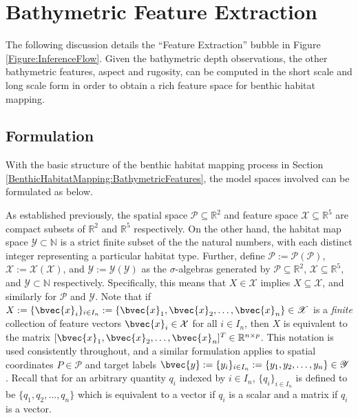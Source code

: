 \chapter{Bathymetric Feature Extraction}
\label{Appendix:BathymetricFeatureExtraction}

	The following discussion details the ``Feature Extraction'' bubble in Figure \ref{Figure:InferenceFlow}. Given the bathymetric depth observations, the other bathymetric features, aspect and rugosity, can be computed in the short scale and long scale form in order to obtain a rich feature space for benthic habitat mapping.
	
	\section{Formulation}
	\label{Appendix:BathymetricFeatureExtraction:Formulation}
	
		With the basic structure of the benthic habitat mapping process in Section \ref{BenthicHabitatMapping:BathymetricFeatures}, the model spaces involved can be formulated as below.
		
		As established previously, the spatial space $\mathcal{P} \subseteq \mathbb{R}^{2}$ and feature space $\mathcal{X} \subseteq \mathbb{R}^{5}$ are compact subsets of $\mathbb{R}^{2}$ and $\mathbb{R}^{5}$ respectively. On the other hand, the habitat map space $\mathcal{Y} \subset \mathbb{N}$ is a strict finite subset of the the natural numbers, with each distinct integer representing a particular habitat type. Further, define $\mathscr{P} := \mathscr{P}(\mathcal{P})$, $\mathscr{X} := \mathscr{X}(\mathcal{X})$, and $\mathscr{Y} := \mathscr{Y}(\mathcal{Y})$ as the $\sigma$-algebras generated by $\mathcal{P} \subseteq \mathbb{R}^{2}$, $\mathcal{X} \subseteq \mathbb{R}^{5}$, and $\mathcal{Y} \subset \mathbb{N}$ respectively. Specifically, this means that $X \in \mathscr{X}$ implies $X \subseteq \mathcal{X}$, and similarly for $\mathscr{P}$ and $\mathscr{Y}$. Note that if $X := \{\bvec{x}_{i}\}_{i \in I_{n}} := \{\bvec{x}_{1}, \bvec{x}_{2}, \dots, \bvec{x}_{n}\} \in \mathscr{X}$ is a \textit{finite} collection of feature vectors $\bvec{x}_{i} \in \mathcal{X}$ for all $i \in I_{n}$, then $X$ is equivalent to the matrix $[\bvec{x}_{1}, \bvec{x}_{2}, \dots, \bvec{x}_{n}]^{T} \in \mathbb{R}^{n \times p}$. This notation is used consistently throughout, and a similar formulation applies to spatial coordinates $P \in \mathscr{P}$ and target labels $\bvec{y} := \{y_{i}\}_{i \in I_{n}} := \{y_{1}, y_{2}, \dots, y_{n}\} \in \mathscr{Y}$. Recall that for an arbitrary quantity $q_{i}$ indexed by $i \in I_{n}$, $\{q_{i}\}_{i \in I_{n}}$ is defined to be $\{q_{1}, q_{2}, \dots, q_{n}\}$ which is equivalent to a vector if $q_{i}$ is a scalar and a matrix if $q_{i}$ is a vector.
			
